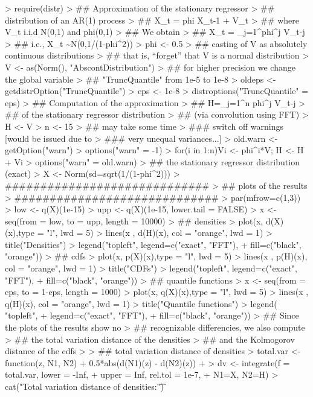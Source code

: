 \documentclass[11pt]{article}
\begin{document}
\begin{Schunk}
\begin{Sinput}
> require(distr)
> ## Approximation of the stationary regressor
> ## distribution of an AR(1) process
> ##       X_t = phi X_{t-1} + V_t
> ## where V_t i.i.d N(0,1) and phi\in(0,1)
> ## We obtain
> ##    X_t = \sum_{j=1}^\infty phi^j V_{t-j}
> ## i.e., X_t \sim N(0,1/(1-phi^2))
> phi <- 0.5
> ## casting of V as absolutely continuous distributions
> ## that is, ``forget'' that V is a normal distribution
> V <- as(Norm(), "AbscontDistribution")
> ## for higher precision we change the global variable
> ## "TruncQuantile" from 1e-5 to 1e-8
> oldeps <- getdistrOption("TruncQuantile")
> eps <- 1e-8
> distroptions("TruncQuantile" = eps)
> ## Computation of the approximation
> ##      H=\sum_{j=1}^n phi^j V_{t-j}
> ## of the stationary regressor distribution
> ## (via convolution using FFT)
> H <- V
> n <- 15
> ## may take some time
> ### switch off warnings [would be issued due to
> ###  very unequal variances...]
> old.warn <- getOption("warn")
> options("warn" = -1)
> for(i in 1:n){Vi <- phi^i*V; H <- H + Vi }
> options("warn" = old.warn)
> ## the stationary regressor distribution (exact)
> X <- Norm(sd=sqrt(1/(1-phi^2)))
> #############################
> ## plots of the results
> #############################
> par(mfrow=c(1,3))
> low <- q(X)(1e-15)
> upp <- q(X)(1e-15, lower.tail = FALSE)
> x <- seq(from = low, to = upp, length = 10000)
> ## densities
> plot(x, d(X)(x),type = "l", lwd = 5)
> lines(x , d(H)(x), col = "orange", lwd = 1)
> title("Densities")
> legend("topleft", legend=c("exact", "FFT"),
+         fill=c("black", "orange"))
> ## cdfs
> plot(x, p(X)(x),type = "l", lwd = 5)
> lines(x , p(H)(x), col = "orange", lwd = 1)
> title("CDFs")
> legend("topleft", legend=c("exact", "FFT"),
+         fill=c("black", "orange"))
> ## quantile functions
> x <- seq(from = eps, to = 1-eps, length = 1000)
> plot(x, q(X)(x),type = "l", lwd = 5)
> lines(x , q(H)(x), col = "orange", lwd = 1)
> title("Quantile functions")
> legend( "topleft",
+         legend=c("exact", "FFT"),
+         fill=c("black", "orange"))
> ## Since the plots of the results show no
> ## recognizable differencies, we also compute
> ## the total variation distance of the densities
> ## and the Kolmogorov distance of the cdfs
>
> ## total variation distance of densities
> total.var <- function(z, N1, N2){
+     0.5*abs(d(N1)(z) - d(N2)(z))
+ }
> dv <- integrate(f = total.var, lower = -Inf,
+                 upper = Inf, rel.tol = 1e-7,
+                 N1=X, N2=H)
> cat("Total variation distance of densities:\t")

\end{Sinput}
\end{Schunk}
\end{document}
